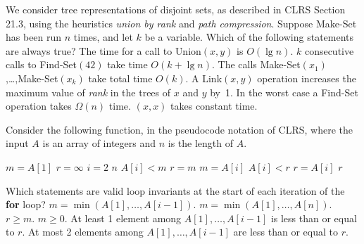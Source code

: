 We consider tree representations of disjoint sets, as described in CLRS Section 21.3, using the heuristics \emph{union by rank} and \emph{path compression}.
Suppose {\sc Make-Set} has been run $n$ times, and let $k$ be a variable.
Which of the following statements are always true?
\multipleanswers
\optionsstart
\answer The time for a call to {\sc Union}$(x,y)$ is $O(\lg n)$. \correct
\answer $k$ consecutive calls to {\sc Find-Set}$(42)$ take time $O(k + \lg n)$. \correct
\answer The calls {\sc Make-Set}$(x_1)$,\dots,{\sc Make-Set}$(x_k)$ take total time $O(k)$. \correct
\answer A {\sc Link}$(x,y)$ operation increases the maximum value of \emph{rank} in the trees of $x$ and $y$ by~1.
\answer In the worst case a {\sc Find-Set} operation takes $\Omega(n)$ time.
$(x,x)$ takes constant time.
\optionsend
{}


Consider the following function, in the pseudocode notation of CLRS, where the input $A$ is an array of integers and $n$ is the length of $A$.
\begin{codebox}
  \li $m = A[1]$
  \li $r = \infty$
  \li \For $i = 2$ \To $n$
  \li \Do \If $A[i] < m$
  \li         \Then $r = m$
  \li         $m = A[i]$
  \li       \ElseIf $A[i] < r$
  \li     \Then $r = A[i]$  \End \End \End
  \li \Return $r$
\end{codebox}

\noindent
Which statements are valid loop invariants at the start of each iteration of the {\bf for} loop?
\multipleanswers
\optionsstart
\answer $m = \min(A[1],\dots,A[i-1])$. \correct
\answer $m = \min(A[1],\dots,A[n])$.
\answer $r \geq m$. \correct
\answer $m \geq 0$.
\answer At least 1 element among $A[1],\dots,A[i-1]$ is less than or equal to $r$. \correct
\answer At most 2 elements among $A[1],\dots,A[i-1]$ are less than or equal to $r$.
\optionsend




